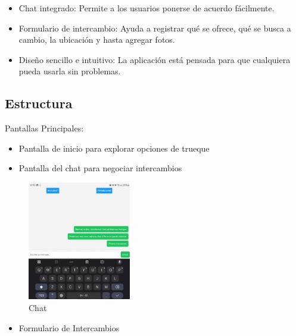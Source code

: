 \documentclass[11pt, a4paper, oneside]{book}
\begin{document}
\begin{itemize}
    \item Chat integrado: Permite a los usuarios ponerse de acuerdo fácilmente.
\end{itemize}

\begin{itemize}
    \item Formulario de intercambio: Ayuda a registrar qué se ofrece, qué se busca a cambio, la ubicación y hasta agregar fotos.
\end{itemize}

\begin{itemize}
    \item Diseño sencillo e intuitivo: La aplicación está pensada para que cualquiera pueda usarla sin problemas.
\end{itemize}

\subsection{Estructura}
     Pantallas Principales:
\begin{itemize}
    \item Pantalla de inicio para explorar opciones de trueque 
\end{itemize}


\begin{itemize}
    \item Pantalla del chat para negociar intercambios 
\end{itemize}

\begin{figure}[H]
\centering
\includegraphics[width=0.4\textwidth]{Pictures/chat.png}
\caption{Chat}
\end{figure}

\begin{itemize}
    \item Formulario de Intercambios  
\end{itemize}
\end{document}
